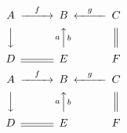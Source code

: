 \documentclass{article}
\begin{document}
\[\begin{CD} A @>f>> B @<g<< C\\ @VVV @AaAbA @| \\ D @= E @. F\end{CD}\]
\[\begin{CD} A @ >f>> B @ <g<< C\\ @ VVV @ AaAbA @ | \\ D @ = E @ . F\end{CD}\]
\end{document}
